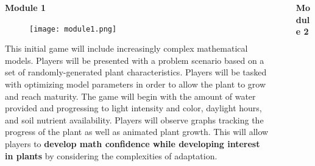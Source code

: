 \documentclass[final]{beamer}
\newlength{\sepwid}
\newlength{\onecolwid}
\newlength{\twocolwid}
\begin{document}
\begin{frame}[t]
\begin{columns}[t]
\begin{column}{\onecolwid}
\begin{alertblock}{\color{Grey}\textbf{Module 1}}
	
	\begin{figure}
		\texttt{[image: module1.png]}
	\end{figure}
	{\small This initial game will include increasingly complex mathematical models. Players will be presented with a problem scenario based on a set of randomly-generated plant characteristics. Players will be tasked with optimizing model parameters in order to allow the plant to grow and reach maturity. The game will begin with the amount of water provided and progressing to light intensity and color, daylight hours, and soil nutrient availability. Players will observe graphs tracking the progress of the plant as well as animated plant growth. This will allow players to \textbf{develop math confidence while developing interest in plants} by considering the complexities of adaptation.}
\end{alertblock}



\end{column} %

\begin{column}{\sepwid}\end{column} %

\begin{column}{\twocolwid} %

\vspace{-1cm}
\begin{alertblock}{\color{Grey}\textbf{Module 2}}
\begin{figure}
	\texttt{[image: poster\_figs.png]}


\end{figure}
\end{alertblock}
\end{column}
\end{columns}
\end{frame}
\end{document}
